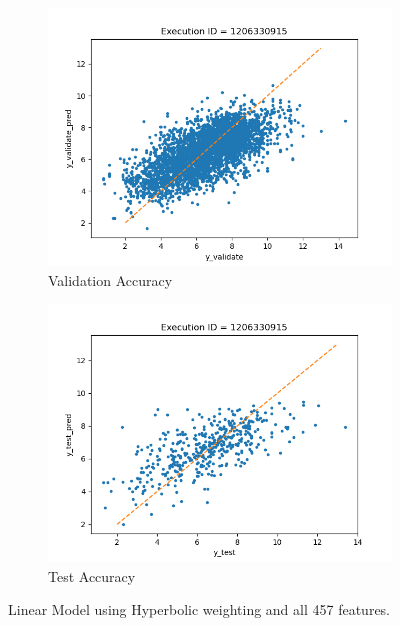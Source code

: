 \documentclass[11pt]{article}
\begin{document}

\begin{figure}
     \centering
     \begin{subfigure}[b]{0.45\textwidth}
         \centering
         \includegraphics[scale=0.45]{images/accuracyValidateLGHyperbolic}
         \caption{Validation Accuracy}
        \label{fig:accuracyValidateLGHyperbolic}
     \end{subfigure}
     \hfill
     \begin{subfigure}[b]{0.45\textwidth}
         \centering
         \includegraphics[scale=0.45]{images/accuracytestLGHyperbolic}
        \caption{Test Accuracy}
        \label{fig:accuracytestLGHyperbolic}
     \end{subfigure}
     \caption{Linear Model using Hyperbolic weighting and all 457 features.}
     \label{fig:BestLinearModel}
\end{figure}
\end{document}
